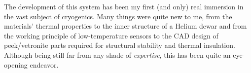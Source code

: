 \begin{refsection}
    \noindent
    The development of this system has been my first (and only) real immersion in the vast subject of cryogenics. 
    Many things were quite new to me, from the materials' thermal properties to the inner structure of a Helium dewar and from the working principle of low-temperature sensors to the CAD design of peek/vetronite parts required for structural stability and thermal insulation.
    Although being still far from any shade of \textit{expertise}, this has been quite an eye-opening endeavor.
    
\printbibliography[
    heading = bibliographychapter,
    title=Bibliography on \ce{LH2}
]

\end{refsection}
